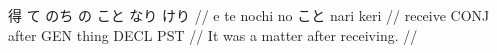 \ex
\begingl
\gla 得 て のち の こと なり けり //
\glb e te nochi no こと nari keri //
\glc receive CONJ after GEN thing DECL PST //
\glft It was a matter after receiving. //
\endgl
\xe
